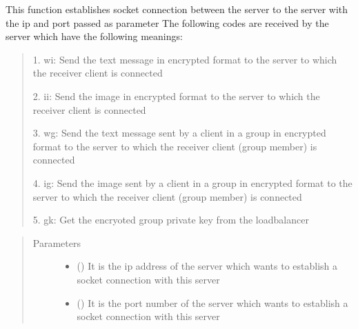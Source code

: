 \documentclass[letterpaper,10pt,english]{sphinxmanual}
\begin{document}

\begin{fulllineitems}
\label{\detokenize{server:server.letsconnect}}
\sphinxAtStartPar
This function establishes socket connection between the server to the server with the ip and port passed as parameter
The following codes are received by the server which have the following meanings:
\begin{quote}

\begin{DUlineblock}{0em}
\item[] 1. wi: Send the text message in encrypted format to the server to which the receiver client is connected
\item[] 2. ii: Send the image in encrypted format to the server to which the receiver client is connected
\item[] 3. wg: Send the text message sent by a client in a group in encrypted format to the server to which the receiver client (group member) is connected
\item[] 4. ig: Send the image sent by a client in a group in encrypted format to the server to which the receiver client (group member) is connected
\item[] 5. gk: Get the encryoted group private key from the loadbalancer
\end{DUlineblock}
\end{quote}
\begin{quote}\begin{description}
\item[{Parameters}] \leavevmode\begin{itemize}
\item {} 
\sphinxAtStartPar
{} () \textendash{} It is the ip address of the server which wants to establish a socket connection with this server

\item {} 
\sphinxAtStartPar
{} () \textendash{} It is the port number of the server which wants to establish a socket connection with this server

\end{itemize}

\end{description}\end{quote}

\end{fulllineitems}
\end{document}
